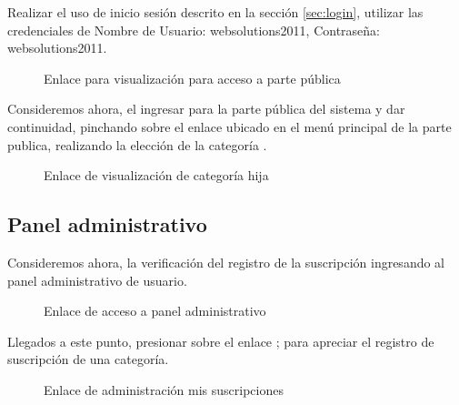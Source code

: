 Realizar el uso de inicio sesión descrito en la sección \ref{sec:login}, utilizar
las credenciales de Nombre de Usuario: websolutions2011, Contraseña:
websolutions2011.

\begin{figure}[!ht]
\centering
		\caption{Enlace para visualización para acceso a parte pública}
\end{figure}

Consideremos ahora, el ingresar para la parte pública del sistema y dar
continuidad, pinchando sobre el enlace ubicado en el menú principal de la
parte publica, realizando la elección de la categoría .

\begin{figure}[!ht]
\centering
		\caption{Enlace de visualización de categoría hija}
\end{figure}

\subsection{Panel administrativo} \label{ssec:dashboard}

Consideremos ahora, la verificación del registro de la suscripción ingresando
al panel administrativo de usuario.

\begin{figure}[!ht]
\centering
		\caption{Enlace de acceso a panel administrativo}
\end{figure}

Llegados a este punto, presionar sobre el enlace ; para apreciar el registro de suscripción de una categoría.

\begin{figure}[!ht]
\centering
		\caption{Enlace de administración mis suscripciones}
\end{figure}

